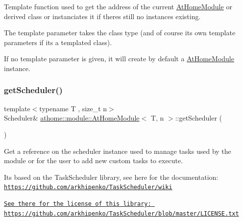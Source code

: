 Template function used to get the address of the current \mbox{\hyperlink{classathome_1_1module_1_1_at_home_module}{At\+Home\+Module}} or derived class or instanciates it if there\textquotesingle{}s still no instances existing.

The template parameter takes the class type (and of course it\textquotesingle{}s own template parameters if it\textquotesingle{}s a templated class).

If no template parameter is given, it will create by default a \mbox{\hyperlink{classathome_1_1module_1_1_at_home_module}{At\+Home\+Module}} instance. \mbox{\label{classathome_1_1module_1_1_at_home_module_a954f37f05e5738f270a35fef58782ba6}} 
\subsubsection{\texorpdfstring{get\+Scheduler()}{getScheduler()}}
{\footnotesize\ttfamily template$<$typename T , size\+\_\+t n$>$ \\
Scheduler\& \mbox{\hyperlink{classathome_1_1module_1_1_at_home_module}{athome\+::module\+::\+At\+Home\+Module}}$<$ T, n $>$\+::get\+Scheduler (\begin{DoxyParamCaption}{ }\end{DoxyParamCaption})\hspace{0.3cm}{\ttfamily [inline]}}

Get a reference on the scheduler instance used to manage tasks used by the module or for the user to add new custom tasks to execute.

It\textquotesingle{}s based on the Task\+Scheduler library, see here for the documentation\+: \href{https://github.com/arkhipenko/TaskScheduler/wiki}{\tt https\+://github.\+com/arkhipenko/\+Task\+Scheduler/wiki}

\href{https://github.com/arkhipenko/TaskScheduler/blob/master/LICENSE.txt}{\tt See there for the license of this library\+: https\+://github.\+com/arkhipenko/\+Task\+Scheduler/blob/master/\+L\+I\+C\+E\+N\+S\+E.\+txt} \mbox{\label{classathome_1_1module_1_1_at_home_module_ae0d4458da2bafd104386671d300fb562}} 
